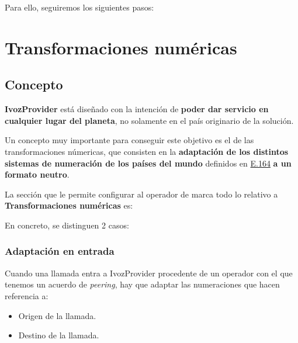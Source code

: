 \documentclass[letterpaper,10pt,spanish]{sphinxmanual}
\begin{document}
Para ello, seguiremos los siguientes pasos:


\section{Transformaciones numéricas}
\label{external_incoming_calls/numeric_transformations:transformaciones-numericas}\label{external_incoming_calls/numeric_transformations::doc}\label{external_incoming_calls/numeric_transformations:numeric-transformations}

\subsection{Concepto}
\label{external_incoming_calls/numeric_transformations:concepto}
\textbf{IvozProvider} está diseñado con la intención de \textbf{poder dar servicio en cualquier lugar del planeta}, no solamente en el país originario de la solución.

Un concepto muy importante para conseguir este objetivo es el de las transformaciones númericas, que consisten en la \textbf{adaptación de los distintos sistemas de numeración de los países del mundo} definidos en \href{https://www.itu.int/rec/T-REC-E.164/es}{E.164} \textbf{a un formato neutro}.

La sección que le permite configurar al operador de marca todo lo relativo a \textbf{Transformaciones numéricas} es:


En concreto, se distinguen 2 casos:


\subsubsection{Adaptación en entrada}
\label{external_incoming_calls/numeric_transformations:adaptacion-en-entrada}
Cuando una llamada entra a IvozProvider procedente de un operador con el que tenemos un acuerdo de \emph{peering}, hay que adaptar las numeraciones que hacen referencia a:
\begin{itemize}
\item {} 
Origen de la llamada.

\item {} 
Destino de la llamada.

\end{itemize}
\end{document}
